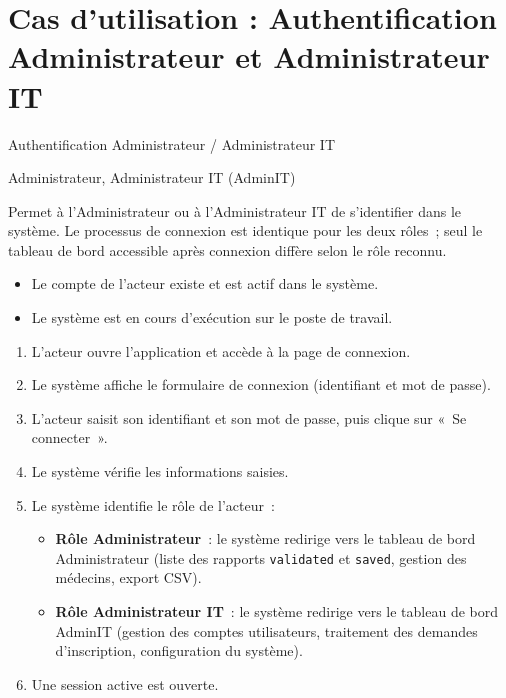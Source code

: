 \documentclass[11pt]{article}
\begin{document}
\section*{Cas d'utilisation : Authentification Administrateur et Administrateur IT}

\begin{description}[leftmargin=4.2cm, style=nextline]
    \item[Titre de cas d'utilisation] Authentification Administrateur / Administrateur IT

    \item[Acteurs principaux] Administrateur, Administrateur IT (AdminIT)

    \item[Description] Permet à l'Administrateur ou à l'Administrateur IT de s'identifier
    dans le système. Le processus de connexion est identique pour les deux rôles~;
    seul le tableau de bord accessible après connexion diffère selon le rôle reconnu.

    \item[Préconditions]
    \begin{itemize}[leftmargin=*, nosep]
        \item Le compte de l'acteur existe et est actif dans le système.
        \item Le système est en cours d'exécution sur le poste de travail.
    \end{itemize}

    \item[Scénario principal]
    \begin{enumerate}[leftmargin=*, topsep=0pt, itemsep=0pt]
        \item L'acteur ouvre l'application et accède à la page de connexion.
        \item Le système affiche le formulaire de connexion (identifiant et mot de passe).
        \item L'acteur saisit son identifiant et son mot de passe, puis clique sur
              «~Se connecter~».
        \item Le système vérifie les informations saisies.
        \item Le système identifie le rôle de l'acteur~:
        \begin{itemize}[leftmargin=*, nosep]
            \item \textbf{Rôle Administrateur}~: le système redirige vers le tableau de bord
                  Administrateur (liste des rapports \texttt{validated} et \texttt{saved},
                  gestion des médecins, export CSV).
            \item \textbf{Rôle Administrateur IT}~: le système redirige vers le tableau de bord
                  AdminIT (gestion des comptes utilisateurs, traitement des demandes
                  d'inscription, configuration du système).
        \end{itemize}
        \item Une session active est ouverte.
    \end{enumerate}


\end{description}
\end{document}
